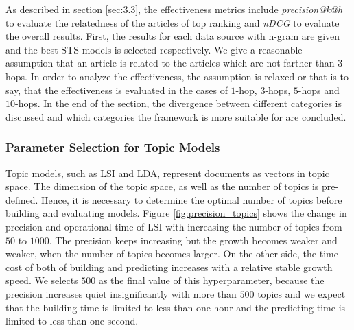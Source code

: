 As described in section \ref{sec:3.3}, the effectiveness metrics include \textit{precision@k@h} to evaluate the relatedness of the articles of top ranking and \textit{nDCG} to evaluate the overall results. First, the results for each data source with n-gram are given and the best STS models is selected respectively. We give a reasonable assumption that an article is related to the articles which are not farther than $3$ hops. In order to analyze the effectiveness, the assumption is relaxed or that is to say, that the effectiveness is evaluated in the cases of $1$-hop, $3$-hops, $5$-hops and $10$-hops. In the end of the section, the divergence between different categories is discussed and which categories the framework is more suitable for are concluded.  

\subsubsection{Parameter Selection for Topic Models}

Topic models, such as LSI and LDA, represent documents as vectors in topic space. The dimension of the topic space, as well as the number of topics is pre-defined. Hence, it is necessary to determine the optimal number of topics before building and evaluating models. Figure \ref{fig:precision_topics} shows the change in precision and operational time of LSI with increasing the number of topics from $50$ to $1000$. The precision keeps increasing but the growth becomes weaker and weaker, when the number of topics becomes larger. On the other side, the time cost of both of building and predicting increases with a relative stable growth speed. We selects $500$ as the final value of this hyperparameter, because the precision increases quiet insignificantly with more than $500$ topics and we expect that the building time is limited to less than one hour and the predicting time is limited to less than one second. 

